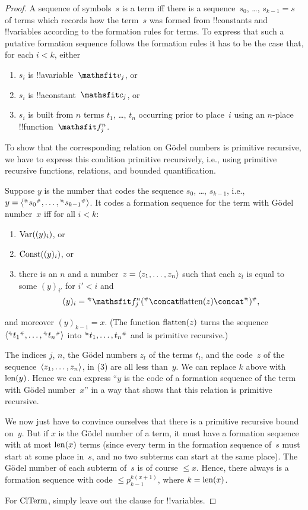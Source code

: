 \documentclass[../../../include/open-logic-section]{subfiles}
\begin{document}
\begin{proof}
A sequence of symbols~$s$ is a term iff there is a sequence~$s_0$,
\dots, $s_{k-1} = s$ of terms which records how the term~$s$ was formed
from !!{constant}s and !!{variable}s according to the formation rules
for terms. To express that such a putative formation sequence follows
the formation rules it has to be the case that, for each $i < k$, either
\begin{enumerate}
\item $s_i$ is !!a{variable}~$\Obj v_j$, or
\item $s_i$ is !!a{constant}~$\Obj c_j$, or
\item $s_i$ is built from $n$ terms $t_1$, \dots, $t_n$ occurring
  prior to place~$i$ using an $n$-place !!{function}~$\Obj f^n_j$.
\end{enumerate}
To show that the corresponding relation on G\"odel numbers is
primitive recursive, we have to express this condition primitive
recursively, i.e., using primitive recursive functions, relations, and
bounded quantification.

Suppose $y$ is the number that codes the sequence $s_0$, \dots, $s_{k-1}$,
i.e., $y = \tuple{\Gn{s_0}, \dots, \Gn{s_{k-1}}}$.  It codes a formation
sequence for the term with G\"odel number~$x$ iff for all $i < k$:
\begin{enumerate}
\item $\mathrm{Var}((y)_i)$, or
\item $\mathrm{Const}((y)_i)$, or
\item there is an $n$ and a number~$z = \langle z_1, \dots, z_n \rangle$ such
  that each $z_l$ is equal to some $(y)_{i'}$ for $i' < i$ and
\[
(y)_i = \Gn{\Obj f^n_j(} \concat \fn{flatten}(z) \concat \Gn{)},
\]
\end{enumerate}
and moreover $(y)_{k-1} = x$.  (The function $\mathrm{flatten}(z)$ turns
the sequence $\tuple{\Gn{t_1}, \dots, \Gn{t_n}}$ into $\Gn{t_1, \dots,
  t_n}$ and is primitive recursive.)

The indices $j$, $n$, the G\"odel numbers $z_l$ of the terms $t_l$,
and the code~$z$ of the sequence~$\langle z_1, \dots, z_n \rangle$, in (3) are
all less than~$y$.  We can replace $k$ above with $\mathrm{len}(y)$.  Hence we
can express ``$y$ is the code of a formation sequence of the term with
G\"odel number~$x$'' in a way that shows that this relation is
primitive recursive.

We now just have to convince ourselves that there is a primitive
recursive bound on~$y$.  But if $x$ is the G\"odel number of a term,
it must have a formation sequence with at most $\mathrm{len}(x)$ terms (since
every term in the formation sequence of~$s$ must start at some place
in~$s$, and no two subterms can start at the same place).  The G\"odel
number of each subterm of~$s$ is of course $\le x$.  Hence, there
always is a formation sequence with code $\le p_{k-1}^{k(x+1)}$, where
$k=\mathrm{len}(x)$.

For $\mathrm{ClTerm}$, simply leave out the clause for !!{variable}s.
\end{proof}
\end{document}
